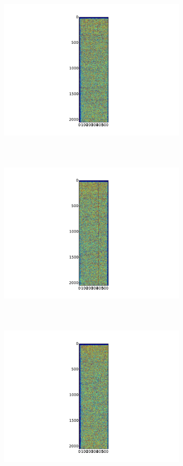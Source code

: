 \documentclass[a4paper, 11pt, spanish]{article}
\begin{document}
\begin{figure}[!ht]
\centering
\begin{subfigure}{.5\textwidth}
  \centering
  \includegraphics[width=10cm, height=8cm]{img/bias 1.pdf}
  \caption{}
  \label{fig:bias1}
\end{subfigure}%
\begin{subfigure}{.5\textwidth}
  \centering
  \includegraphics[width=10cm, height=8cm]{img/bias 2.pdf}
  \caption{}
  \label{fig:bias2}
\end{subfigure}
\begin{subfigure}{.5\textwidth}
  \centering
  \includegraphics[width=10cm, height=8cm]{img/bias 3.pdf}

\end{subfigure}
\end{figure}
\end{document}
